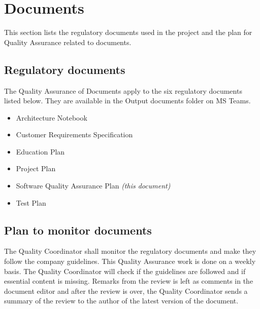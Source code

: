 \section{Documents}
This section lists the regulatory documents used in the project and the plan for Quality Assurance related to documents.

\subsection{Regulatory documents}
The Quality Assurance of Documents apply to the six regulatory documents listed below. They are available in the Output documents folder on MS Teams.
\begin{itemize}
\item Architecture Notebook
\item Customer Requirements Specification
\item Education Plan
\item Project Plan
\item Software Quality Assurance Plan \emph{(this document)}
\item Test Plan
\end{itemize}

\subsection{Plan to monitor documents}
The Quality Coordinator shall monitor the regulatory documents and make they follow the company guidelines. This Quality Assurance work is done on a weekly basis. The Quality Coordinator will check if the guidelines are followed and if essential content is missing. Remarks from the review is left as comments in the document editor and after the review is over, the Quality Coordinator sends a summary of the review to the author of the latest version of the document.

